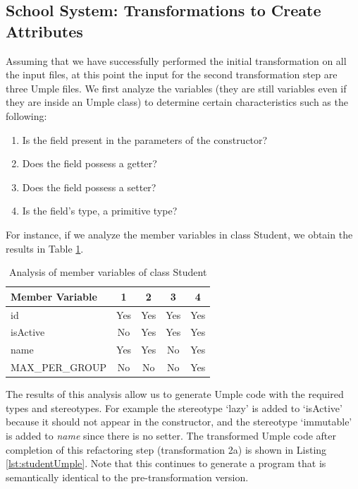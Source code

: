 \subsection{School System: Transformations to Create Attributes}

Assuming that we have successfully performed the initial transformation on all the input files, at this point the input for the second transformation step are three Umple files.
We first analyze the variables (they are still variables even if they are inside an Umple class) to determine certain characteristics such as the following:

\begin{enumerate}
\item Is the field present in the parameters of the constructor?
\item Does the field possess a getter?
\item Does the field possess a setter?
\item Is the field's type, a primitive type?
\end{enumerate}

For instance, if we analyze the member variables in class Student, we obtain the results in Table \ref{table:analysisStudent}.

\begin{table}[ht]
\caption{Analysis of member variables of class Student}
\label{table:analysisStudent}
\centering
\begin{tabular}{l|cccc}
\toprule
\rowcolor[HTML]{BBDAFF}
\textbf{Member Variable} & \textbf{1}  & \textbf{2}   & \textbf{3}   & \textbf{4}    \\ \hline
id & Yes &  Yes &  Yes &  Yes \\ 
isActive &  No &  Yes &  Yes &  Yes \\ 
name &  Yes &  Yes &  No &  Yes \\ 
MAX\_PER\_GROUP &  No &  No &  No &  Yes \\ 
\hline
\end{tabular}
\end{table}

The results of this analysis allow us to generate Umple code with the required types and stereotypes. For example the stereotype `lazy' is added to `isActive' because it should not appear in the constructor, and the stereotype `immutable' is added to \textit{name} since there is no setter. The transformed Umple code after completion of this refactoring step (transformation 2a) is shown in Listing \ref{lst:studentUmple}. Note that this continues to generate a program that is semantically identical to the pre-transformation version.

